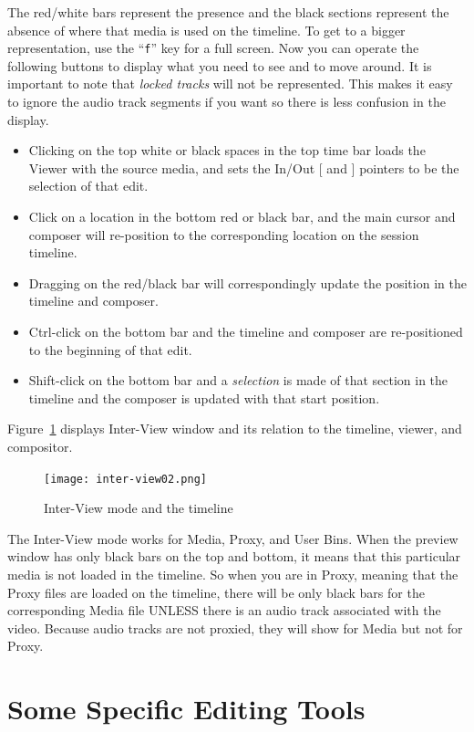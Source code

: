 The red/white bars represent the presence and the black sections
represent the absence of where that media is used on the timeline.
To get to a bigger representation, use the “\texttt{f}” key for a
full screen.  Now you can operate the following buttons to display
what you need to see and to move around.  It is important to note
that \textit{locked tracks} will not be represented.  This makes it
easy to ignore the audio track segments if you want so there is less
confusion in the display.

\begin{itemize}
\item Clicking on the top white or black spaces in the top time
  bar loads the Viewer with the source media, and sets the In/Out [
  and ] pointers to be the selection of that edit.
\item Click on a location in the bottom red or black bar, and
  the main cursor and composer will re-position to the corresponding
  location on the session timeline.
\item Dragging on the red/black bar will correspondingly update
  the position in the timeline and composer.
\item Ctrl-click on the bottom bar and the timeline and composer
  are re-positioned to the beginning of that edit.
\item Shift-click on the bottom bar and a \textit{selection} is
  made of that section in the timeline and the composer is updated
  with that start position.
\end{itemize}

Figure~\ref{fig:inter-view02} displays Inter-View window and its
relation to the timeline, viewer, and compositor.
\begin{figure}[ht]
  \centering
  \texttt{[image: inter-view02.png]}
  \caption{Inter-View mode and the timeline}
  \label{fig:inter-view02}
\end{figure}

The Inter-View mode works for Media, Proxy, and User Bins.  When the
preview window has only black bars on the top and bottom, it means
that this particular media is not loaded in the timeline.  So when
you are in Proxy, meaning that the Proxy files are loaded on the
timeline, there will be only black bars for the corresponding Media
file UNLESS there is an audio track associated with the video.
Because audio tracks are not proxied, they will show for Media but
not for Proxy.


\section{Some Specific Editing Tools}%
\label{sec:specific_editing_tools}

